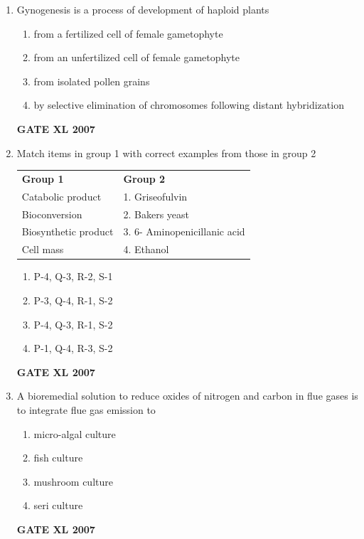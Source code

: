 \documentclass[journal,12pt,onecolumn]{IEEEtran}
\begin{document}
\begin{enumerate}
    \item Gynogenesis is a process of development of haploid plants
    \begin{enumerate}
        \item from a fertilized cell of female gametophyte
        \item from an unfertilized cell of female gametophyte
        \item from isolated pollen grains
        \item by selective elimination of chromosomes following distant hybridization
    \end{enumerate}
	    \hfill \textbf{GATE XL 2007}

    \item Match items in group 1 with correct examples from those in group 2
    
    

    \begin{tabularx}{\textwidth}{@{}lX@{}}
	    \textbf{Group 1} & \textbf{Group 2}\\
	     Catabolic product & 1. Griseofulvin\\
	     Bioconversion & 2. Bakers yeast\\
		    Biosynthetic product & 3. 6- Aminopenicillanic acid\\
	     Cell mass & 4. Ethanol\\
    \end{tabularx}
    \begin{enumerate}
        \item P-4, Q-3, R-2, S-1
        \item P-3, Q-4, R-1, S-2
        \item P-4, Q-3, R-1, S-2
        \item P-1, Q-4, R-3, S-2
    \end{enumerate}
	    \hfill \textbf{GATE XL 2007}

    \item A bioremedial solution to reduce oxides of nitrogen and carbon in flue gases is to integrate flue gas emission to
    \begin{enumerate}
        \item micro-algal culture
        \item fish culture
        \item mushroom culture
        \item seri culture
    \end{enumerate}
	    \hfill \textbf{GATE XL 2007}


\end{enumerate}
\end{document}

